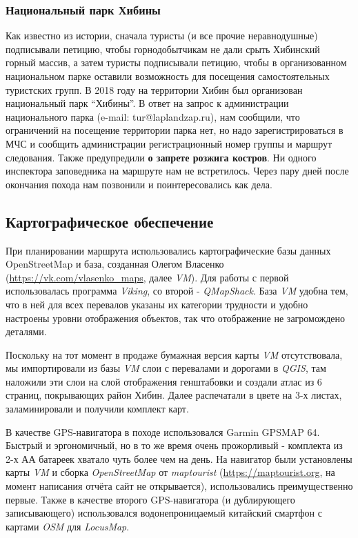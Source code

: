 \subsubsection{Национальный парк Хибины}
Как известно из истории, сначала туристы (и все прочие неравнодушные) подписывали петицию,
чтобы горнодобытчикам не дали срыть Хибинский горный массив, а затем туристы подписывали петицию,
чтобы в организованном национальном парке оставили возможность для посещения самостоятельных туристских групп.
В 2018 году на территории Хибин был организован национальный парк ``Хибины''.
В ответ на запрос к администрации национального парка (e-mail: tur@laplandzap.ru), нам сообщили,
что ограничений на посещение территории парка нет, но надо зарегистрироваться в МЧС
и сообщить администрации регистрационный номер группы и маршрут следования.
Также предупредили \textbf{\color{red}о запрете розжига костров}. Ни одного инспектора заповедника на маршруте нам не встретилось.
Через пару дней после окончания похода нам позвонили и поинтересовались как дела.

\subsection{Картографическое обеспечение}
При планировании маршрута использовались картографические базы данных OpenStreetMap и база,
созданная Олегом Власенко (\url{https://vk.com/vlasenko_maps}, далее \textit{VM}).
Для работы с первой использовалась программа \textit{Viking},
со второй - \textit{QMapShack}. База \textit{VM} удобна тем, что в ней для всех перевалов указаны их категории трудности
и удобно настроены уровни отображения объектов, так что отображение не загромождено деталями.

Поскольку на тот момент в продаже бумажная версия карты \textit{VM} отсутствовала,
мы импортировали из базы \textit{VM} слои с перевалами и дорогами в \textit{QGIS},
там наложили эти слои на слой отображения генштабовки и создали атлас из 6 страниц,
покрывающих район Хибин. Далее распечатали в цвете на 3-х листах, заламинировали и получили комплект карт.

В качестве GPS-навигатора в походе использовался Garmin GPSMAP 64.
Быстрый и эргономичный, но в то же время очень прожорливый - комплекта из 2-х АА батареек хватало чуть более чем на день.
На навигатор были установлены карты \textit{VM} и сборка \textit{OpenStreetMap}
от \textit{maptourist} (\url{https://maptourist.org}, на момент написания отчёта сайт не открывается),
использовались преимущественно первые. Также в качестве второго GPS-навигатора (и дублирующего записывающего)
использовался водонепроницаемый китайский смартфон с картами \textit{OSM} для \textit{LocusMap}.

